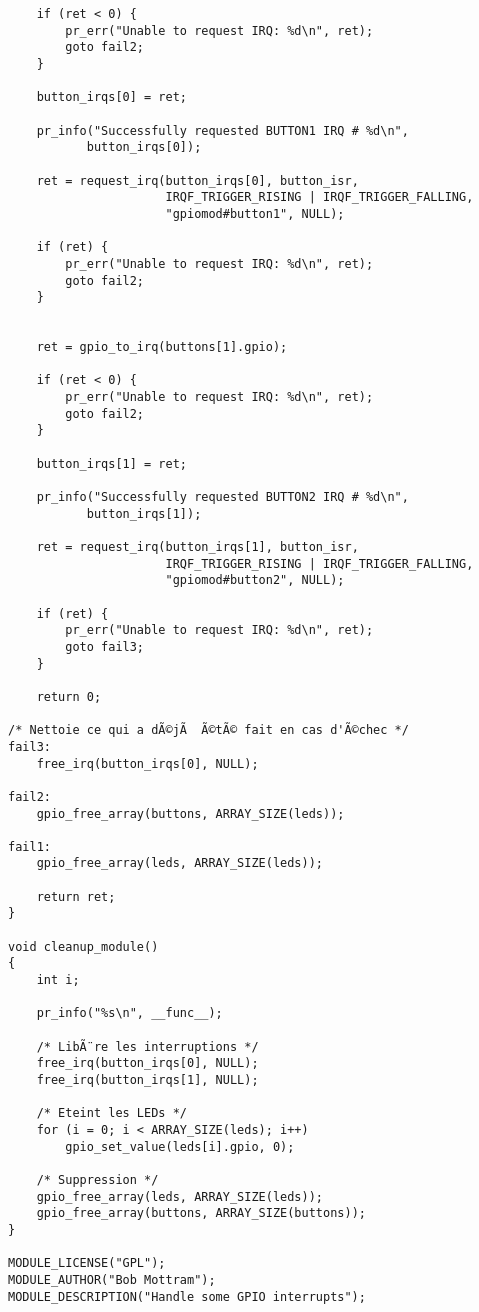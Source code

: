 \documentclass[11pt]{article}
\begin{document}
\begin{verbatim}
    if (ret < 0) {
        pr_err("Unable to request IRQ: %d\n", ret);
        goto fail2;
    }

    button_irqs[0] = ret;

    pr_info("Successfully requested BUTTON1 IRQ # %d\n",
           button_irqs[0]);

    ret = request_irq(button_irqs[0], button_isr,
                      IRQF_TRIGGER_RISING | IRQF_TRIGGER_FALLING,
                      "gpiomod#button1", NULL);

    if (ret) {
        pr_err("Unable to request IRQ: %d\n", ret);
        goto fail2;
    }


    ret = gpio_to_irq(buttons[1].gpio);

    if (ret < 0) {
        pr_err("Unable to request IRQ: %d\n", ret);
        goto fail2;
    }

    button_irqs[1] = ret;

    pr_info("Successfully requested BUTTON2 IRQ # %d\n",
           button_irqs[1]);

    ret = request_irq(button_irqs[1], button_isr,
                      IRQF_TRIGGER_RISING | IRQF_TRIGGER_FALLING,
                      "gpiomod#button2", NULL);

    if (ret) {
        pr_err("Unable to request IRQ: %d\n", ret);
        goto fail3;
    }

    return 0;

/* Nettoie ce qui a dÃ©jÃ  Ã©tÃ© fait en cas d'Ã©chec */
fail3:
    free_irq(button_irqs[0], NULL);

fail2:
    gpio_free_array(buttons, ARRAY_SIZE(leds));

fail1:
    gpio_free_array(leds, ARRAY_SIZE(leds));

    return ret;
}

void cleanup_module()
{
    int i;

    pr_info("%s\n", __func__);

    /* LibÃ¨re les interruptions */
    free_irq(button_irqs[0], NULL);
    free_irq(button_irqs[1], NULL);

    /* Eteint les LEDs */
    for (i = 0; i < ARRAY_SIZE(leds); i++)
        gpio_set_value(leds[i].gpio, 0);

    /* Suppression */
    gpio_free_array(leds, ARRAY_SIZE(leds));
    gpio_free_array(buttons, ARRAY_SIZE(buttons));
}

MODULE_LICENSE("GPL");
MODULE_AUTHOR("Bob Mottram");
MODULE_DESCRIPTION("Handle some GPIO interrupts");
\end{verbatim}
\end{document}
